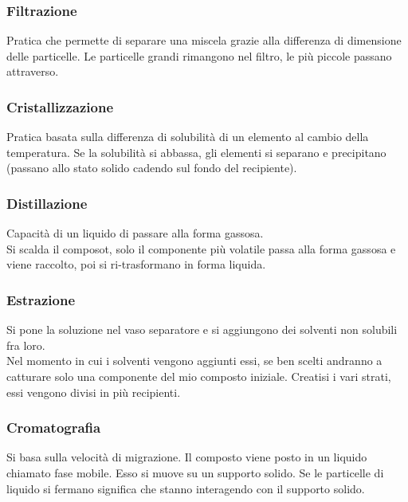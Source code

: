 \subsubsection{Filtrazione}
Pratica che permette di separare una miscela grazie alla differenza di dimensione delle particelle. Le particelle grandi rimangono nel filtro, le più piccole passano attraverso.
\subsubsection{Cristallizzazione}
Pratica basata sulla differenza di solubilità di un elemento al cambio della temperatura. Se la solubilità si abbassa, gli elementi si separano e precipitano (passano allo stato solido cadendo sul fondo del recipiente).
\subsubsection{Distillazione}
Capacità di un liquido di passare alla forma gassosa.\\
Si scalda il composot, solo il componente più volatile passa alla forma gassosa e viene raccolto, poi si ri-trasformano in forma liquida.
\subsubsection{Estrazione}
Si pone la soluzione nel vaso separatore e si aggiungono dei solventi non solubili fra loro.\\
Nel momento in cui i solventi vengono aggiunti essi, se ben scelti andranno a catturare solo una componente del mio composto iniziale. Creatisi i vari strati, essi vengono divisi in più recipienti.
\subsubsection{Cromatografia}
Si basa sulla velocità di migrazione. Il composto viene posto in un liquido chiamato fase mobile. Esso si muove su un supporto solido. Se le particelle di liquido si fermano significa che stanno interagendo con il supporto solido.
